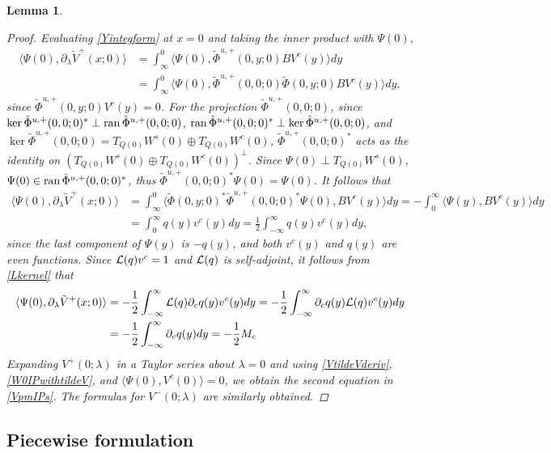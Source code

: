 \documentclass[12pt]{elsarticle}
\theoremstyle{plain}
\newtheorem{lemma}[theorem]{Lemma}
\theoremstyle{definition}
\theoremstyle{remark}
\numberwithin{theorem}{section}
\numberwithin{equation}{section}
\begin{document}
\begin{lemma}
\begin{proof}
Evaluating \cref{Yintegform} at $x = 0$ and taking the inner product with $\Psi(0)$, 
\begin{align*}
\langle \Psi(0), \partial_\lambda \tilde{V}^+(x; 0)  \rangle
&= \int_{\infty}^0 \langle \Psi(0), \tilde{\Phi}^{u,+}(0,y; 0) B V^c(y) \rangle dy \\
&= \int_{\infty}^0 \langle \Psi(0), \tilde{\Phi}^{u,+}(0,0; 0) \tilde{\Phi}(0,y; 0) B V^c(y) \rangle dy,
\end{align*}
since $\tilde{\Phi}^{u,+}(0,y; 0) V^c(y) = 0$. For the projection $\tilde{\Phi}^{u,+}(0,0; 0)$, since $\mathop\mathrm{ker}\nolimits \tilde{\Phi}^{u,+}(0, 0; 0)^* \perp \operatorname{ran} \tilde{\Phi}^{u,+}(0, 0; 0)$, $\operatorname{ran} \tilde{\Phi}^{u,+}(0, 0; 0)^* \perp \mathop\mathrm{ker}\nolimits \tilde{\Phi}^{u,+}(0, 0; 0)$, and $\ker \tilde{\Phi}^{u,+}(0, 0; 0) = T_{Q(0)} W^s(0) \oplus T_{Q(0)} W^c(0)$, $\tilde{\Phi}^{u,+}(0, 0; 0)^*$ acts as the identity on $(T_{Q(0)} W^s(0) \oplus T_{Q(0)} W^c(0))^\perp$. Since $\Psi(0) \perp T_{Q(0)} W^s(0)$, $\Psi(0) \in \operatorname{ran} \tilde{\Phi}^{u,+}(0, 0; 0)^*$, thus $\tilde{\Phi}^{u,+}(0, 0; 0)^* \Psi(0) = \Psi(0)$. It follows that
\begin{align*}
\langle \Psi(0), \partial_\lambda \tilde{V}^+(x; 0)  \rangle
&= \int_{\infty}^0 \langle \tilde{\Phi}(0,y; 0)^* \tilde{\Phi}^{u,+}(0,0; 0)^* \Psi(0), B V^c(y) \rangle dy = -\int_0^\infty \langle \Psi(y), B V^c(y) \rangle dy \\
&= \int_0^\infty q(y) v^c(y) dy = \frac{1}{2}\int_{-\infty}^\infty q(y) v^c(y) dy ,
\end{align*}
since the last component of $\Psi(y)$ is $-q(y)$, and both $v^c(y)$ and $q(y)$ are even functions. Since $\mathcal{L}(q)v^c = 1$ and $\mathcal{L}(q)$ is self-adjoint, it follows from \cref{Lkernel} that
\begin{align*}
\langle \Psi(0), \partial_\lambda \tilde{V}^+(x; 0) \rangle
&= -\frac{1}{2} \int_{-\infty}^\infty \mathcal{L}(q) \partial_c q(y) v^c(y) dy 
= -\frac{1}{2} \int_{-\infty}^\infty \partial_c q(y) \mathcal{L}(q) v^c(y) dy \\
&= -\frac{1}{2} \int_{-\infty}^\infty \partial_c q(y) dy = -\frac{1}{2}M_c
\end{align*}
Expanding $V^+(0; \lambda)$ in a Taylor series about $\lambda = 0$ and using \cref{VtildeVderiv}, \cref{W0IPwithtildeV}, and $\langle \Psi(0), V^c(0)\rangle = 0$, we obtain the second equation in \cref{VpmIPs}. The formulas for $V^-(0; \lambda)$ are similarly obtained.
\end{proof}
\end{lemma}

\subsection{Piecewise formulation}
\end{document}
